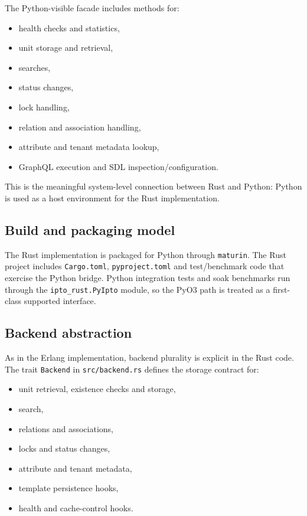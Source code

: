 The Python-visible facade includes methods for:
\begin{itemize}
\item health checks and statistics,
\item unit storage and retrieval,
\item searches,
\item status changes,
\item lock handling,
\item relation and association handling,
\item attribute and tenant metadata lookup,
\item GraphQL execution and SDL inspection/configuration.
\end{itemize}

This is the meaningful system-level connection between Rust and Python: Python is used as a host environment for the Rust implementation.

\subsection{Build and packaging model}

The Rust implementation is packaged for Python through \texttt{maturin}. The Rust project includes \texttt{Cargo.toml}, \texttt{pyproject.toml} and test/benchmark code that exercise the Python bridge. Python integration tests and soak benchmarks run through the \texttt{ipto\_rust.PyIpto} module, so the PyO3 path is treated as a first-class supported interface.

\subsection{Backend abstraction}

As in the Erlang implementation, backend plurality is explicit in the Rust code. The trait \texttt{Backend} in \texttt{src/backend.rs} defines the storage contract for:
\begin{itemize}
\item unit retrieval, existence checks and storage,
\item search,
\item relations and associations,
\item locks and status changes,
\item attribute and tenant metadata,
\item template persistence hooks,
\item health and cache-control hooks.
\end{itemize}

